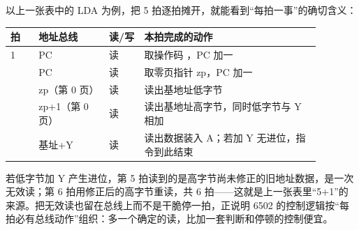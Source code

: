 以上一张表中的 LDA  为例，把 5 拍逐拍摊开，就能看到“每拍一事”的确切含义：

\begin{longtable}{L{0.08\linewidth}L{0.2\linewidth}L{0.1\linewidth}L{0.5\linewidth}}
\toprule
拍 & 地址总线 & 读/写 & 本拍完成的动作 \\
 & PC & 读 & 取操作码 ，PC 加一 \\ & PC & 读 & 取零页指针 zp，PC 加一 \\ & zp（第 0 页） & 读 & 读出基地址低字节 \\ & zp+1（第 0 页） & 读 & 读出基地址高字节，同时低字节与 Y 相加 \\ & 基址+Y & 读 & 读出数据装入 A；若加 Y 无进位，指令到此结束 \\
\bottomrule
\end{longtable}

若低字节加 Y 产生进位，第 5 拍读到的是高字节尚未修正的旧地址数据，是一次无效读；第 6 拍用修正后的高字节重读，共 6 拍——这就是上一张表里“5+1”的来源。把无效读也留在总线上而不是干脆停一拍，正说明 6502 的控制逻辑按“每拍必有总线动作”组织：多一个确定的读，比加一套判断和停顿的控制便宜。

